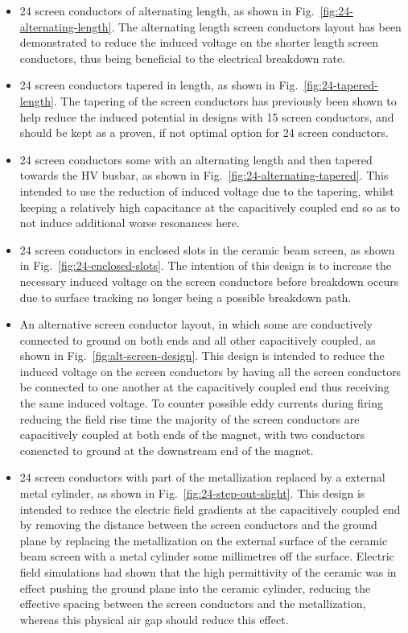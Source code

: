 \begin{itemize}
\item{24 screen conductors of alternating length, as shown in Fig.~\ref{fig:24-alternating-length}. The alternating length screen conductors layout has been demonstrated to reduce the induced voltage on the shorter length screen conductors, thus being beneficial to the electrical breakdown rate.}
\item{24 screen conductors tapered in length, as shown in Fig.~\ref{fig:24-tapered-length}. The tapering of the screen conductors has previously been shown to help reduce the induced potential in designs with 15 screen conductors, and should be kept as a proven, if not optimal option for 24 screen conductors.}
\item{24 screen conductors some with an alternating length and then tapered towards the HV busbar, as shown in Fig.~\ref{fig:24-alternating-tapered}. This intended to use the reduction of induced voltage due to the tapering, whilst keeping a relatively high capacitance at the capacitively coupled end so as to not induce additional worse resonances here.}
\item{24 screen conductors in enclosed slots in the ceramic beam screen, as shown in Fig.~\ref{fig:24-enclosed-slots}. The intention of this design is to increase the necessary induced voltage on the screen conductors before breakdown occurs due to surface tracking no longer being a possible breakdown path.}
\item{An alternative screen conductor layout, in which some are conductively connected to ground on both ends and all other capacitively coupled, as shown in Fig.~\ref{fig:alt-screen-design}. This design is intended to reduce the induced voltage on the screen conductors by having all the screen conductors be connected to one another at the capacitively coupled end thus receiving the same induced voltage. To counter possible eddy currents during firing reducing the field rise time the majority of the screen conductors are capacitively coupled at both ends of the magnet, with two conductors conencted to ground at the downstream end of the magnet.}
\item{24 screen conductors with part of the metallization replaced by a external metal cylinder, as shown in Fig.~\ref{fig:24-step-out-slight}. This design is intended to reduce the electric field gradients at the capacitively coupled end by removing the distance between the screen conductors and the ground plane by replacing the metallization on the external surface of the ceramic beam screen with a metal cylinder some millimetres off the surface. Electric field simulations had shown that the high permittivity of the ceramic was in effect pushing the ground plane into the ceramic cylinder, reducing the effective spacing between the screen conductors and the metallization, whereas this physical air gap should reduce this effect.}

\end{itemize}
